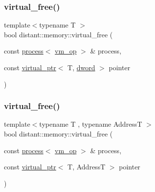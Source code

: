 \mbox{\label{namespacedistant_1_1memory_acd6d17802cc6c8b096b24c6fc7818f2d}} 
\subsubsection{\texorpdfstring{virtual\+\_\+free()}{virtual\_free()}\hspace{0.1cm}{\footnotesize\ttfamily [1/2]}}
{\footnotesize\ttfamily template$<$typename T $>$ \\
bool distant\+::memory\+::virtual\+\_\+free (\begin{DoxyParamCaption}\item[{const \mbox{\hyperlink{classdistant_1_1kernel__objects_1_1process}{process}}$<$ \mbox{\hyperlink{namespacedistant_af02d4223cd2f509cc373ac9d83655f19}{vm\+\_\+op}} $>$ \&}]{process,  }\item[{const \mbox{\hyperlink{classdistant_1_1memory_1_1virtual__ptr}{virtual\+\_\+ptr}}$<$ T, \mbox{\hyperlink{namespacedistant_a9fa41a5a1a17dcbd24da1c1855c92489}{dword}} $>$}]{pointer }\end{DoxyParamCaption})\hspace{0.3cm}{\ttfamily [noexcept]}}

\mbox{\label{namespacedistant_1_1memory_a08a756a4933a9202174e3ecbc91a9f26}} 
\subsubsection{\texorpdfstring{virtual\+\_\+free()}{virtual\_free()}\hspace{0.1cm}{\footnotesize\ttfamily [2/2]}}
{\footnotesize\ttfamily template$<$typename T , typename AddressT $>$ \\
bool distant\+::memory\+::virtual\+\_\+free (\begin{DoxyParamCaption}\item[{const \mbox{\hyperlink{classdistant_1_1kernel__objects_1_1process}{process}}$<$ \mbox{\hyperlink{namespacedistant_af02d4223cd2f509cc373ac9d83655f19}{vm\+\_\+op}} $>$ \&}]{process,  }\item[{const \mbox{\hyperlink{classdistant_1_1memory_1_1virtual__ptr}{virtual\+\_\+ptr}}$<$ T, AddressT $>$}]{pointer }\end{DoxyParamCaption})\hspace{0.3cm}{\ttfamily [noexcept]}}


